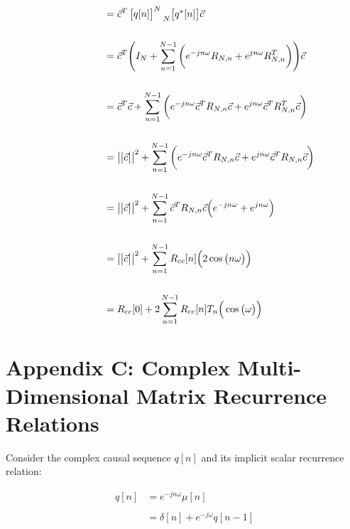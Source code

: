 \documentclass{article}
\begin{document}
\begin{align*}
    &\quad \quad \quad \quad \quad = \vec{c}^{T}\begin{bmatrix} q[n] \end{bmatrix}^{N}\prescript{}{N}{\begin{bmatrix} q^{*}[n] \end{bmatrix}}\vec{c} \\ \\
    &\quad \quad \quad \quad \quad = \vec{c}^{T}\Bigg(I_{N} + \sum_{n = 1}^{N - 1}\bigg( e^{-jn\omega}R_{N, n} + e^{ jn\omega}R_{N, n}^{T} \bigg)\Bigg)\vec{c} \\ \\
    &\quad \quad \quad \quad \quad = \vec{c}^{T}\vec{c} + \sum_{n = 1}^{N - 1}\bigg( e^{-jn\omega}\vec{c}^{T}R_{N, n}\vec{c} + e^{ jn\omega}\vec{c}^{T}R_{N, n}^{T}\vec{c} \bigg) \\ \\
    &\quad \quad \quad \quad \quad = \big|\big|\vec{c}\big|\big|^{2} + \sum_{n = 1}^{N - 1}\bigg( e^{-jn\omega}\vec{c}^{T}R_{N, n}\vec{c} + e^{ jn\omega}\vec{c}^{T}R_{N, n}\vec{c} \bigg) \\ \\
    &\quad \quad \quad \quad \quad = \big|\big|\vec{c}\big|\big|^{2} + \sum_{n = 1}^{N - 1}\vec{c}^{T}R_{N, n}\vec{c}\Big( e^{-jn\omega} + e^{ jn\omega} \Big) \\ \\
    &\quad \quad \quad \quad \quad = \big|\big|\vec{c}\big|\big|^{2} + \sum_{n = 1}^{N - 1}R_{cc}[n]\Big( 2\cos\big(n\omega\big) \Big) \\ \\
    &\quad \quad \quad \quad \quad = R_{cc}[0] + 2\sum_{n = 1}^{N - 1}R_{cc}[n]T_{n}\Big(\cos\big(\omega\big)\Big)
  \end{align*}

\newpage
\section*{Appendix C: Complex Multi-Dimensional Matrix Recurrence Relations}

Consider the complex causal sequence $q[n]$ and its implicit scalar recurrence relation:

\begin{align*}
    q[n]&= e^{-jn\omega}\mu[n] \\ \\
        &= \delta[n] + e^{-j\omega}q[n - 1]
  \end{align*}\newline
\end{document}
